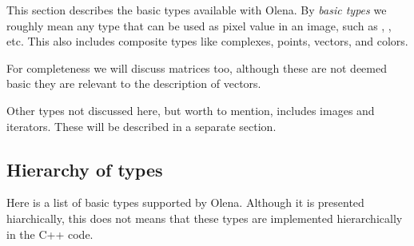 
This section describes the basic types available with Olena. By
\emph{basic types} we roughly mean any type that can be used as pixel
value in an image, such as , , etc.  This also
includes composite types like complexes, points, vectors, and colors.

For completeness we will discuss matrices too, although these are not
deemed basic they are relevant to the description of vectors.

Other types not discussed here, but worth to mention, includes
images and iterators.  These will be described in a separate section.


\subsection{Hierarchy of types}

Here is a list of basic types supported by Olena.  Although it is
presented hiarchically, this does not means that these types are
implemented hierarchically in the C++ code.

